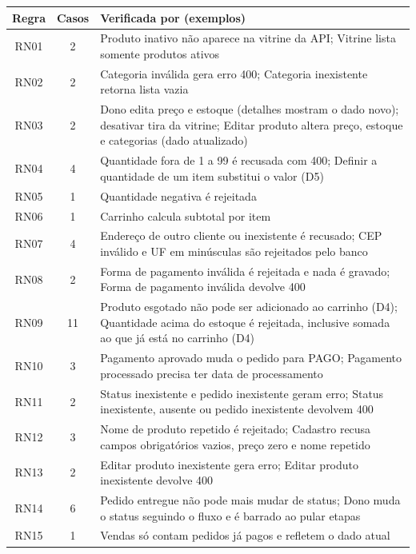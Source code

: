 \begin{longtable}{|c|c|p{9.4cm}|}
\hline
\rowcolor{gray!30} \textbf{Regra} & \textbf{Casos} & \textbf{Verificada por (exemplos)} \\ \hline
\endhead
RN01 & 2 & \small Produto inativo não aparece na vitrine da API; Vitrine lista somente produtos ativos \\ \hline
RN02 & 2 & \small Categoria inválida gera erro 400; Categoria inexistente retorna lista vazia \\ \hline
RN03 & 2 & \small Dono edita preço e estoque (detalhes mostram o dado novo); desativar tira da vitrine; Editar produto altera preço, estoque e categorias (dado atualizado) \\ \hline
RN04 & 4 & \small Quantidade fora de 1 a 99 é recusada com 400; Definir a quantidade de um item substitui o valor (D5) \\ \hline
RN05 & 1 & \small Quantidade negativa é rejeitada \\ \hline
RN06 & 1 & \small Carrinho calcula subtotal por item \\ \hline
RN07 & 4 & \small Endereço de outro cliente ou inexistente é recusado; CEP inválido e UF em minúsculas são rejeitados pelo banco \\ \hline
RN08 & 2 & \small Forma de pagamento inválida é rejeitada e nada é gravado; Forma de pagamento inválida devolve 400 \\ \hline
RN09 & 11 & \small Produto esgotado não pode ser adicionado ao carrinho (D4); Quantidade acima do estoque é rejeitada, inclusive somada ao que já está no carrinho (D4) \\ \hline
RN10 & 3 & \small Pagamento aprovado muda o pedido para PAGO; Pagamento processado precisa ter data de processamento \\ \hline
RN11 & 2 & \small Status inexistente e pedido inexistente geram erro; Status inexistente, ausente ou pedido inexistente devolvem 400 \\ \hline
RN12 & 3 & \small Nome de produto repetido é rejeitado; Cadastro recusa campos obrigatórios vazios, preço zero e nome repetido \\ \hline
RN13 & 2 & \small Editar produto inexistente gera erro; Editar produto inexistente devolve 400 \\ \hline
RN14 & 6 & \small Pedido entregue não pode mais mudar de status; Dono muda o status seguindo o fluxo e é barrado ao pular etapas \\ \hline
RN15 & 1 & \small Vendas só contam pedidos já pagos e refletem o dado atual \\ \hline
\end{longtable}